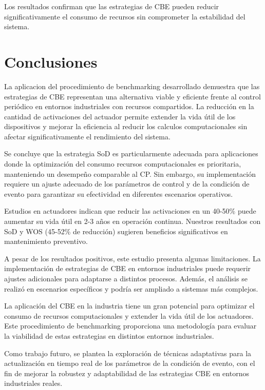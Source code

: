 \documentclass[conference]{IEEEtran}
\begin{document}
Los resultados confirman que las estrategias de CBE pueden reducir significativamente el consumo de recursos sin comprometer la estabilidad del sistema.

\section{Conclusiones}
La aplicacion del procedimiento de benchmarking desarrollado demuestra que las estrategias de CBE representan una alternativa viable y eficiente frente al control periódico en entornos industriales con recursos compartidos. La reducción en la cantidad de activaciones del actuador permite extender la vida útil de los dispositivos y mejorar la eficiencia al reducir los calculos computacionales sin afectar significativamente el rendimiento del sistema.

Se concluye que la estrategia SoD es particularmente adecuada para aplicaciones donde la optimización del consumo recursos computacionales es prioritaria, manteniendo un desempeño comparable al CP. Sin embargo, su implementación requiere un ajuste adecuado de los parámetros de control y de la condición de evento para garantizar su efectividad en diferentes escenarios operativos.

Estudios en actuadores indican que reducir las activaciones en un 40-50\% puede aumentar su vida útil en 2-3 años en operación continua. Nuestros resultados con SoD y WOS (45-52\% de reducción) sugieren beneficios significativos en mantenimiento preventivo.

A pesar de los resultados positivos, este estudio presenta algunas limitaciones. La implementaci\'on de estrategias de CBE en entornos industriales puede requerir ajustes adicionales para adaptarse a distintos procesos. Adem\'as, el an\'alisis se realiz\'o en escenarios espec\'ificos y podr\'ia ser ampliado a sistemas m\'as complejos.

La aplicaci\'on del CBE en la industria tiene un gran potencial para optimizar el consumo de recursos computacionales y extender la vida \'util de los actuadores. Este procedimiento de benchmarking proporciona una metodolog\'ia para evaluar la viabilidad de estas estrategias en distintos entornos industriales.

Como trabajo futuro, se plantea la exploración de técnicas adaptativas para la actualización en tiempo real de los parámetros de la condición de evento, con el fin de mejorar la robustez y adaptabilidad de las estrategias CBE en entornos industriales reales.
\end{document}

